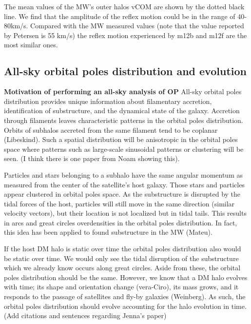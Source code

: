 \documentclass{aastex63}
\begin{document}
The mean values of the MW's outer halos vCOM are shown by the dotted black line. We find that the amplitude of the reflex motion could be in the range of 40-80km/s.  
Compared with the MW measured values (note that the value reported by Petersen is 55 km/s) the reflex motion experienced by m12b and m12f are the most similar ones.


\subsection{All-sky orbital poles distribution and evolution}\label{sec:all_sky}

\textbf{Motivation of performing an all-sky analysis of OP}
All-sky orbital poles distribution provides unique information about filamentary accretion, identification of substructure, and the dynamical state of the galaxy.  Accretion through filaments leaves characteristic patterns in the orbital poles distribution. Orbits of subhalos accreted from the same filament tend to be coplanar (Libeskind). Such a spatial distribution will be anisotropic in the orbital poles space where patterns such as large-scale sinusoidal patterns or clustering will be seen.  (I think there is one paper from Noam showing this). 

Particles and stars belonging to a subhalo have the same angular momentum as measured from the center of the satellite's host galaxy. Those stars and particles appear clustered in orbital poles space. As the substructure is disrupted by the tidal forces of the host, particles will still move in the same direction (similar velocity vectors), but their location is not localized but in tidal tails. This results in arcs and great circles overdensities in the orbital poles distribution. In fact, this idea has been applied to found substructure in the MW (Mateu).

If the host DM halo is static over time the orbital poles distribution also would be static over time. We would only see the tidal disruption of the substructure which we already know occurs along great circles. Aside from these, the orbital poles distribution should be the same. However, we know that a DM halo evolves with time; its shape and orientation change (vera-Ciro), its mass grows, and it responds to the passage of satellites and fly-by galaxies (Weinberg). As such, the orbital poles distribution should evolve accounting for the halo evolution in time. (Add citations and sentences regarding Jenna's paper)
\end{document}
